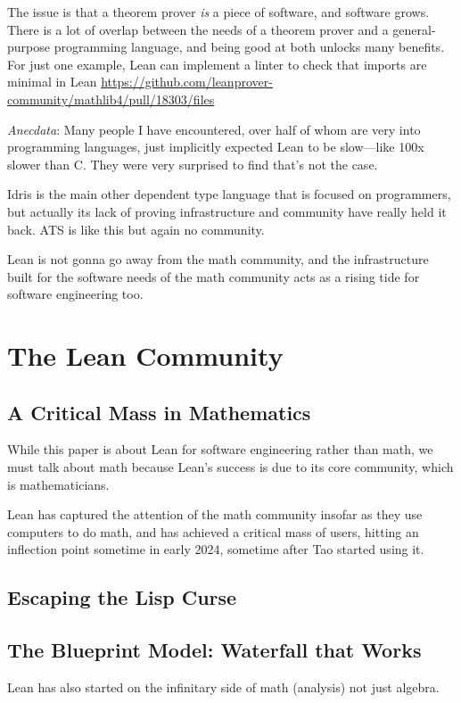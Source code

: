 \documentclass{article}
\begin{document}
The issue is that a theorem prover \textit{is} a piece of software, and software grows. There is a lot of overlap between the needs of a theorem prover and a general-purpose programming language, and being good at both unlocks many benefits. For just one example, Lean can implement a linter to check that imports are minimal in Lean \url{https://github.com/leanprover-community/mathlib4/pull/18303/files}

\textit{Anecdata}: Many people I have encountered, over half of whom are very into programming languages, just implicitly expected Lean to be slow---like 100x slower than C. They were very surprised to find that's not the case.

Idris is the main other dependent type language that is focused on programmers, but actually its lack of proving infrastructure and community have really held it back. ATS is like this but again no community.

Lean is not gonna go away from the math community, and the infrastructure built for the software needs of the math community acts as a rising tide for software engineering too.

\section{The Lean Community}
\subsection{A Critical Mass in Mathematics}

While this paper is about Lean for software engineering rather than math, we must talk about math because Lean's success is due to its core community, which is mathematicians.

Lean has captured the attention of the math community insofar as they use computers to do math, and has achieved a critical mass of users, hitting an inflection point sometime in early 2024, sometime after Tao started using it.
\subsection{Escaping the Lisp Curse}
\subsection{The Blueprint Model: Waterfall that Works}

Lean has also started on the infinitary side of math (analysis) not just algebra.
\end{document}

